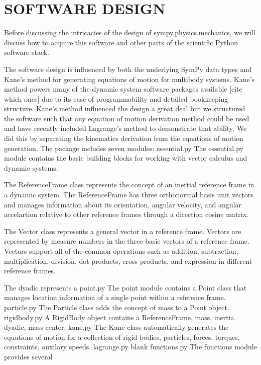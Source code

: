 \documentclass[twocolumn,10pt]{asme2e}
\begin{document}
\section*{SOFTWARE DESIGN}
Before discussing the intricacies of the design of sympy.physics.mechanics, we
will discuss how to acquire this software and other parts of the scientific
Python software stack.



The software design is influenced by both the underlying SymPy data types and
Kane’s method for generating equations of motion for multibody systems. Kane’s
method powers many of the dynamic system software packages available [cite
which ones] due to its ease of programmability and detailed bookkeeping
structure. Kane’s method influenced the design a great deal but we structured
the software such that any equation of motion derivation method could be used
and have recently included Lagrange’s method to demonstrate that ability. We
did this by separating the kinematics derivation from the equations of motion
generation. The package includes seven modules:
essential.py
The essential.py module contains the basic building blocks for working with
vector calculus and dynamic systems.

The ReferenceFrame class represents the concept of an inertial reference frame
in a dynamic system. The ReferenceFrame has three orthonormal basis unit
vectors and manages information about its orientation, angular velocity, and
angular accelartion relative to other reference frames through a direction
cosine matrix.

The Vector class represents a general vector in a reference frame. Vectors are
represented by measure numbers in the three basic vectors of a reference frame.
Vectors support all of the common operations such as addition, subtraction,
multiplication, division, dot products, cross products, and expression in
different reference frames.

The dyadic represents a
point.py
The point module contains a Point class that manages location information of a
single point within a reference frame.
particle.py
The Particle class adds the concept of mass to a Point object.
rigidbody.py
A RigidBody object contains a ReferenceFrame, mass, inertia dyadic, mass
center.
kane.py
The Kane class automatically generates the equations of motion for a collection
of rigid bodies, particles, forces, torques, constraints, auxilary speeds.
lagrange.py
blank
functions.py
The functions module provides several
\end{document}
